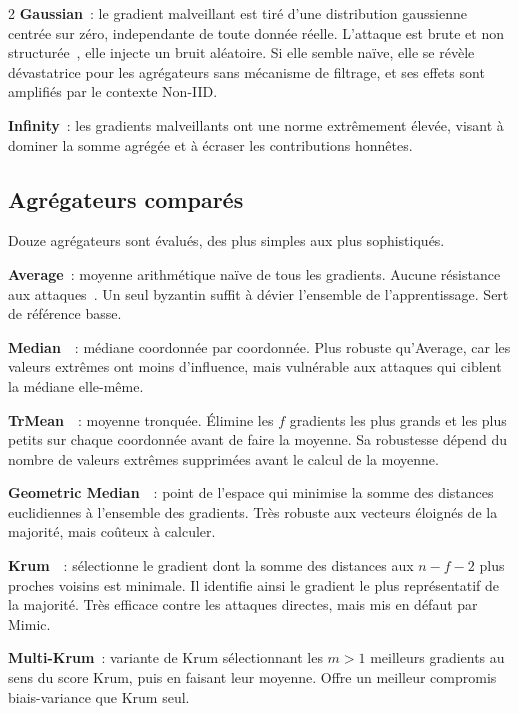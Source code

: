 \documentclass{article}
\begin{document}
\begin{multicols}{2}
\textbf{Gaussian}~: le gradient malveillant est tir\'e d'une distribution gaussienne
centr\'ee sur z\'ero, independante de toute donn\'ee r\'eelle. L'attaque est brute et
non structur\'ee~, elle injecte un bruit al\'eatoire. Si elle semble na\"{i}ve, elle se
r\'ev\`ele d\'evastatrice pour les agr\'egateurs sans m\'ecanisme de filtrage, et ses
effets sont amplifi\'es par le contexte Non-IID.

\textbf{Infinity}~: les gradients malveillants ont une norme extr\^emement \'elev\'ee,
visant \`a dominer la somme agr\'eg\'ee et \`a \'ecraser les contributions honnêtes.

\subsection{Agr\'egateurs compar\'es}

Douze agr\'egateurs sont \'evalu\'es, des plus simples aux plus sophistiqu\'es.

\textbf{Average}~: moyenne arithm\'etique na\"{i}ve de tous les gradients. Aucune
r\'esistance aux attaques~. Un seul byzantin suffit \`a d\'evier l'ensemble de l'apprentissage.
Sert de r\'ef\'erence basse.

\textbf{Median}~\cite{yin2018}~: m\'ediane coordonn\'ee par coordonn\'ee. Plus robuste
qu'Average, car les valeurs extr\^emes ont moins d'influence, mais vuln\'erable aux
attaques qui ciblent la m\'ediane elle-m\^eme.

\textbf{TrMean}~\cite{yin2018}~: moyenne tronqu\'ee. \'Elimine les $f$ gradients les
plus grands et les plus petits sur chaque coordonn\'ee avant de faire la moyenne. Sa robustesse dépend du nombre de valeurs extrêmes supprimées avant le calcul de la moyenne.

\textbf{Geometric Median}~\cite{chen2017}~: point de l'espace qui minimise la somme
des distances euclidiennes \`a l'ensemble des gradients. Tr\`es robuste aux vecteurs
\'eloign\'es de la majorit\'e, mais co\^uteux \`a calculer.

\textbf{Krum}~\cite{blanchard2017}~: s\'electionne le gradient dont la somme des
distances aux $n-f-2$ plus proches voisins est minimale. Il identifie ainsi le
gradient le plus repr\'esentatif de la majorit\'e. Tr\`es efficace contre les attaques
directes, mais mis en d\'efaut par Mimic.

\textbf{Multi-Krum}~: variante de Krum s\'electionnant les $m > 1$ meilleurs gradients
au sens du score Krum, puis en faisant leur moyenne. Offre un meilleur compromis
biais-variance que Krum seul.


\end{multicols}
\end{document}
